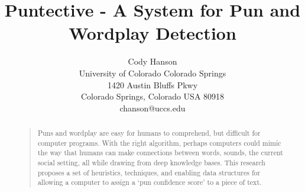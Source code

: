 \documentclass[letterpaper]{article}
\begin{document}
\title{Puntective - A System for Pun and Wordplay Detection}
\author{Cody Hanson\\
University of Colorado Colorado Springs\\
1420 Austin Bluffs Pkwy\\
Colorado Springs, Colorado USA 80918\\
chanson@uccs.edu}
\maketitle
\begin{abstract}
\begin{quote}
Puns and wordplay are easy for humans to comprehend, but difficult for computer programs.
With the right algorithm, perhaps computers could mimic the way that humans can make connections between words, sounds, the current social setting, all while drawing from deep knowledge bases. 
This research proposes a set of heuristics, techniques, and enabling data structures for allowing a computer to assign a `pun confidence score' to a piece of text.
\end{quote}
\end{abstract}









 

\end{document}
